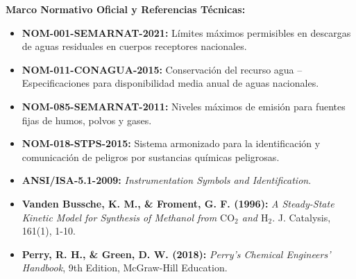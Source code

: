 \documentclass[10pt,landscape]{article}
\begin{document}
\hfill
\begin{minipage}[t]{0.46\textwidth}
  \textbf{\fontsize{8pt}{9.5pt}\selectfont \color{navyblue}Marco Normativo Oficial y Referencias Técnicas:}\par\vspace{2pt}
  \begin{itemize}\scriptsize
    \setlength{\itemsep}{2pt}
    \item \textbf{NOM-001-SEMARNAT-2021:} Límites máximos permisibles en descargas de aguas residuales en cuerpos receptores nacionales.
    \item \textbf{NOM-011-CONAGUA-2015:} Conservación del recurso agua -- Especificaciones para disponibilidad media anual de aguas nacionales.
    \item \textbf{NOM-085-SEMARNAT-2011:} Niveles máximos de emisión para fuentes fijas de humos, polvos y gases.
    \item \textbf{NOM-018-STPS-2015:} Sistema armonizado para la identificación y comunicación de peligros por sustancias químicas peligrosas.
    \item \textbf{ANSI/ISA-5.1-2009:} \textit{Instrumentation Symbols and Identification}.
    \item \textbf{Vanden Bussche, K. M., \& Froment, G. F. (1996):} \textit{A Steady-State Kinetic Model for Synthesis of Methanol from $\text{CO}_2$ and $\text{H}_2$}. J. Catalysis, 161(1), 1-10.
    \item \textbf{Perry, R. H., \& Green, D. W. (2018):} \textit{Perry's Chemical Engineers' Handbook}, 9th Edition, McGraw-Hill Education.
  \end{itemize}
\end{minipage}
\end{document}
